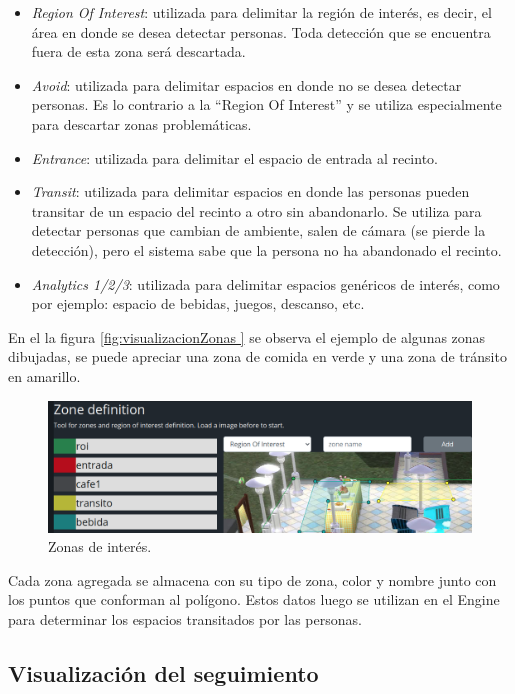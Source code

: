 \begin{itemize}
\item \textit{Region Of Interest}: utilizada para delimitar la región de interés, es decir, el área en donde se desea detectar personas. Toda detección que se encuentra fuera de esta zona será descartada.
\item \textit{Avoid}: utilizada para delimitar espacios en donde no se desea detectar personas. Es lo contrario a la ``Region Of Interest'' y se utiliza especialmente para descartar zonas problemáticas.
\item \textit{Entrance}: utilizada para delimitar el espacio de entrada al recinto.
\item \textit{Transit}: utilizada para delimitar espacios en donde las personas pueden transitar de un espacio del recinto a otro sin abandonarlo. Se utiliza para detectar personas que cambian de ambiente, salen de cámara (se pierde la detección), pero el sistema sabe que la persona no ha abandonado el recinto.
\item \textit{Analytics 1/2/3}: utilizada para delimitar espacios genéricos de interés, como por ejemplo: espacio de bebidas, juegos, descanso, etc.
\end{itemize}

En el la figura \ref{fig:visualizacionZonas	} se observa el ejemplo de algunas zonas dibujadas, se puede apreciar una zona de comida en verde y una zona de tránsito en amarillo.

\begin{figure}[ht]
	\centering
	\includegraphics[scale=.5]{./Figures/visualizacionZonas.png}
	\caption{Zonas de interés.}
	\label{fig:visualizacionZonas}
\end{figure}

Cada zona agregada se almacena con su tipo de zona, color y nombre junto con los puntos que conforman al polígono. Estos datos luego se utilizan en el Engine para determinar los espacios transitados por las personas.

\newpage

\subsection{Visualización del seguimiento}

